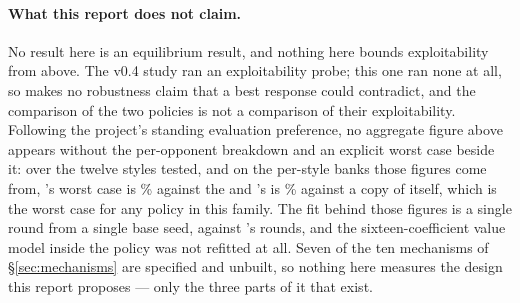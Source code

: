 \paragraph{What this report does not claim.} No result here is an equilibrium
result, and nothing here bounds exploitability from above. The v0.4 study ran an
exploitability probe; this one ran none at all, so \vfive{} makes no robustness
claim that a best response could contradict, and the comparison of the two
policies is not a comparison of their exploitability. Following the project's
standing evaluation preference, no aggregate figure above appears without the
per-opponent breakdown and an explicit worst case beside it: over the twelve
styles tested, and on the per-style banks those figures come from, \vfive{}'s
worst case is \numDecWorst\% against the \numDecWorstOpp{} and \vfour{}'s is
\numVfourWorst\% against a copy of itself, which is the worst case for any
policy in this family. The fit behind those
figures is a single round from a single base seed, against \vfour{}'s
\numVfourFitRounds{} rounds, and the sixteen-coefficient value model inside the
policy was not refitted at all. Seven of the ten mechanisms of
\S\ref{sec:mechanisms} are specified and unbuilt, so nothing here measures the
design this report proposes --- only the three parts of it that exist.
